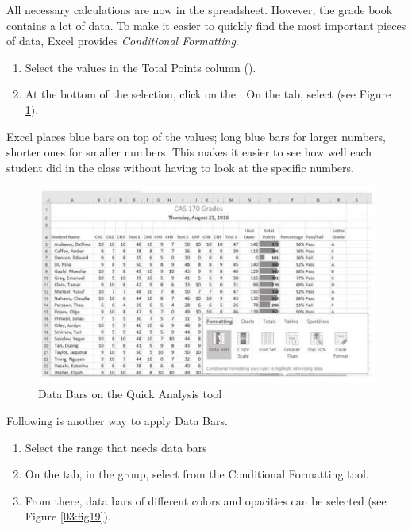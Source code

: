 All necessary calculations are now in the  spreadsheet. However, the grade book contains a lot of data. To make it easier to quickly find the most important pieces of data, Excel provides \textit{Conditional Formatting}.

\begin{enumerate}
	\item Select the values in the Total Points column ().
	\item At the bottom of the selection, click on the . On the  tab, select  (see Figure \ref{03:fig18}).
\end{enumerate}

Excel places blue bars on top of the values; long blue bars for larger numbers, shorter ones for smaller numbers. This makes it easier to see how well each student did in the class without having to look at the specific numbers.

\begin{figure}[H]
	\centering
	\includegraphics[width=\maxwidth{.95\linewidth}]{gfx/ch03_fig18}
	\caption{Data Bars on the Quick Analysis tool}
	\label{03:fig18}
\end{figure}

Following is another way to apply Data Bars.

\begin{enumerate}
	\item Select the range that needs data bars
	\item On the  tab, in the  group, select  from the Conditional Formatting tool.
	\item From there, data bars of different colors and opacities can be selected (see Figure \ref{03:fig19}).
\end{enumerate}

